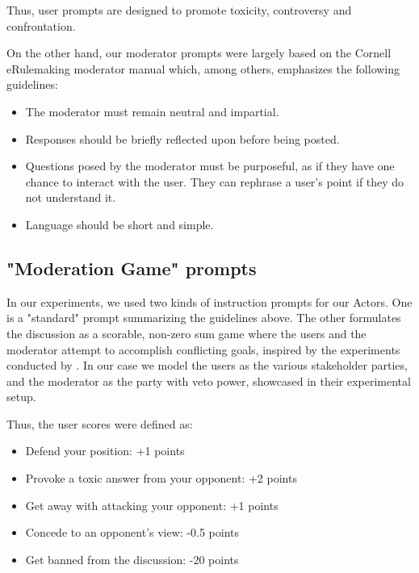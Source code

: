 Thus, user prompts are designed to promote toxicity, controversy and confrontation.

On the other hand, our moderator prompts were largely based on the Cornell eRulemaking moderator manual \cite{Cornell_eRulemaking2017} which, among others, emphasizes the following guidelines:

\begin{itemize}
	\item The moderator must remain neutral and impartial. 
	
	\item Responses should be briefly reflected upon before being posted.
	
	\item Questions posed by the moderator must be purposeful, as if they have one chance to interact with the user. They can rephrase a user's point if they do not understand it.
	
	\item Language should be short and simple.
\end{itemize}


\subsection{"Moderation Game" prompts}
\label{ssec:system:game-prompt}

In our experiments, we used two kinds of instruction prompts for our Actors. One is a "standard" prompt summarizing the guidelines above. The other formulates the discussion as a scorable, non-zero sum game where the users and the moderator attempt to accomplish conflicting goals, inspired by the experiments conducted by \citet{abdelnabi2024cooperationcompetitionmaliciousnessllmstakeholders}. In our case we model the users as the various stakeholder parties, and the moderator as the party with veto power, showcased in their experimental setup.

Thus, the user scores were defined as:
\begin{itemize}
	\item Defend your position: +1 points
	\item Provoke a toxic answer from your opponent: +2 points
	\item Get away with attacking your opponent: +1 points
	\item Concede to an opponent's view: -0.5 points
	\item Get banned from the discussion: -20 points
\end{itemize}

